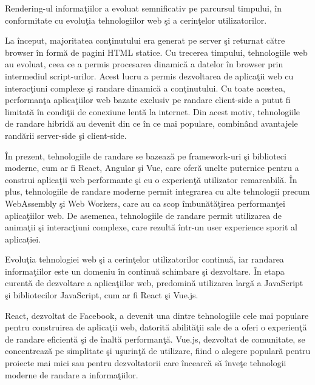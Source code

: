 \documentclass[12pt, a4paper]{report}
\begin{document}
\tableofcontents{}
\listoffigures{}

\newpage{}




Rendering-ul informa\c tiilor a evoluat semnificativ pe parcursul timpului, \^ in conformitate cu evolu\c tia tehnologiilor web \c si a cerin\c telor utilizatorilor.

La \^ inceput, majoritatea con\c tinutului era generat pe server \c si returnat c\u atre browser \^ in form\u a de pagini HTML statice. Cu trecerea timpului, tehnologiile web au evoluat, ceea ce a permis procesarea dinamic\u a a datelor în browser prin intermediul script-urilor. Acest lucru a permis dezvoltarea de aplica\c tii web cu interac\c tiuni complexe \c si randare dinamic\u a a con\c tinutului. Cu toate acestea, performan\c ta aplica\c tiilor web bazate exclusiv pe randare client-side a putut fi limitat\u a \^ in condi\c tii de conexiune lent\u a la internet. Din acest motiv, tehnologiile de randare hibrid\u a au devenit din ce \^ in ce mai populare, combin\^ and avantajele rand\u arii server-side \c si client-side. \cite{html}

\^ In prezent, tehnologiile de randare se bazeaz\u a pe framework-uri \c si biblioteci moderne, cum ar fi React, Angular \c si Vue, care ofer\u a unelte puternice pentru a construi aplica\c tii web performante \c si cu o experien\c t\u a utilizator remarcabil\u a. \^ In plus, tehnologiile de randare moderne permit integrarea cu alte tehnologii precum WebAssembly \c si Web Workers, care au ca scop \^ imbun\u at\u a\c tirea performan\c tei aplica\c tiilor web. De asemenea, tehnologiile de randare permit utilizarea de anima\c tii \c si interac\c tiuni complexe, care rezultă într-un user experience sporit al aplicației.

Evolu\c tia tehnologiei web \c si a cerin\c telor utilizatorilor continu\u a, iar randarea informa\c tiilor este un domeniu \^ in continu\u a schimbare \c si dezvoltare. \^ In etapa curent\u a de dezvoltare a aplica\c tiilor web, predomin\u a utilizarea larg\u a a JavaScript \c si bibliotecilor JavaScript, cum ar fi React \c si Vue.js.

React, dezvoltat de Facebook, a devenit una dintre tehnologiile cele mai populare pentru construirea de aplica\c tii web, datorit\u a abilit\u a\c tii sale de a oferi o experien\c t\u a de randare eficient\u a \c si de \^ inalt\u a performan\c t\u a. Vue.js, dezvoltat de comunitate, se concentreaz\u a pe simplitate \c si u\c surin\c t\u a de utilizare, fiind o alegere popular\u a pentru proiecte mai mici sau pentru dezvoltatorii care \^ incearc\u a s\u a \^ inve\c te tehnologii moderne de randare a informa\c tiilor.
\end{document}
